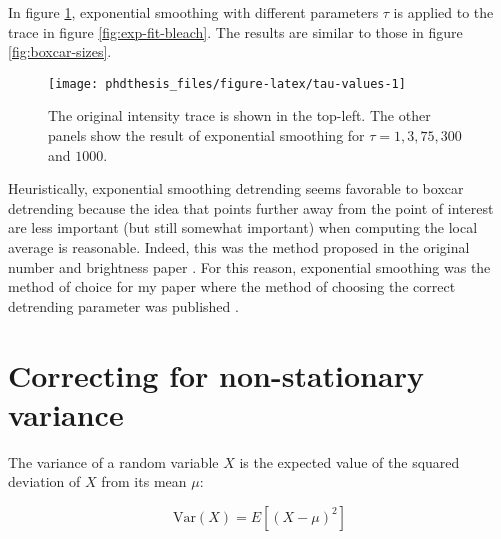 \documentclass[12pt,]{book}
\theoremstyle{definition}
\theoremstyle{definition}
\theoremstyle{definition}
\theoremstyle{remark}
\let\BeginKnitrBlock\begin \let\EndKnitrBlock\end
\begin{document}
In figure \ref{fig:tau-values}, exponential smoothing with different
parameters \(\tau\) is applied to the trace in figure
\ref{fig:exp-fit-bleach}. The results are similar to those in figure
\ref{fig:boxcar-sizes}.





\begin{figure}

\texttt{[image: phdthesis\_files/figure-latex/tau-values-1]} \hfill{}

\caption{The original intensity trace is shown in the
top-left. The other panels show the result of exponential smoothing for
\(\tau = 1, 3, 75, 300\) and \(1000\).}\label{fig:tau-values}
\end{figure}

Heuristically, exponential smoothing detrending seems favorable to
boxcar detrending because the idea that points further away from the
point of interest are less important (but still somewhat important) when
computing the local average is reasonable. Indeed, this was the method
proposed in the original number and brightness paper \citep{NB}. For
this reason, exponential smoothing was the method of choice for my paper
where the method of choosing the correct detrending parameter was
published \citep{nandb}.

\section{Correcting for non-stationary
variance}\label{correcting-for-non-stationary-variance}

\BeginKnitrBlock{definition}
\protect\hypertarget{def:unnamed-chunk-33}{}{\label{def:unnamed-chunk-33}
}The variance of a random variable \(X\) is the expected value of the
squared deviation of \(X\) from its mean \(\mu\):

\begin{equation}
\text{Var}(X) = E[(X - \mu)^2]
\label{eq:variance}
\end{equation}
\EndKnitrBlock{definition}
\end{document}
